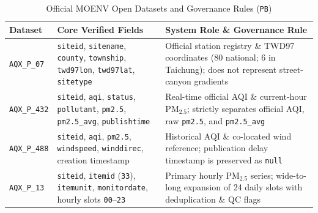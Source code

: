 \begin{table}[!t]
\centering
\footnotesize
\setlength{\tabcolsep}{3.5pt}
\caption{Official MOENV Open Datasets and Governance Rules (\texttt{PB})}
\label{tab:datasets}
\begin{tabular}{L{1.5cm}L{2.5cm}L{3.9cm}}
\toprule
\textbf{Dataset} & \textbf{Core Verified Fields} & \textbf{System Role \& Governance Rule} \\
\midrule
\texttt{AQX\_P\_07} \cite{aqxp07} & \texttt{siteid}, \texttt{sitename}, \texttt{county}, \texttt{township}, \texttt{twd97lon}, \texttt{twd97lat}, \texttt{sitetype} & Official station registry \& TWD97 coordinates (80 national; 6 in Taichung); does not represent street-canyon gradients \\
\texttt{AQX\_P\_432} \cite{aqxp432} & \texttt{siteid}, \texttt{aqi}, \texttt{status}, \texttt{pollutant}, \texttt{pm2.5}, \texttt{pm2.5\_avg}, \texttt{publishtime} & Real-time official AQI \& current-hour $\text{PM}_{2.5}$; strictly separates official AQI, raw \texttt{pm2.5}, and \texttt{pm2.5\_avg} \\
\texttt{AQX\_P\_488} \cite{aqxp488} & \texttt{siteid}, \texttt{aqi}, \texttt{pm2.5}, \texttt{windspeed}, \texttt{winddirec}, creation timestamp & Historical AQI \& co-located wind reference; publication delay timestamp is preserved as \texttt{null} \\
\texttt{AQX\_P\_13} \cite{aqxp13} & \texttt{siteid}, \texttt{itemid} (\texttt{33}), \texttt{itemunit}, \texttt{monitordate}, hourly slots \texttt{00}--\texttt{23} & Primary hourly $\text{PM}_{2.5}$ series; wide-to-long expansion of 24 daily slots with deduplication \& QC flags \\
\bottomrule
\end{tabular}
\end{table}

